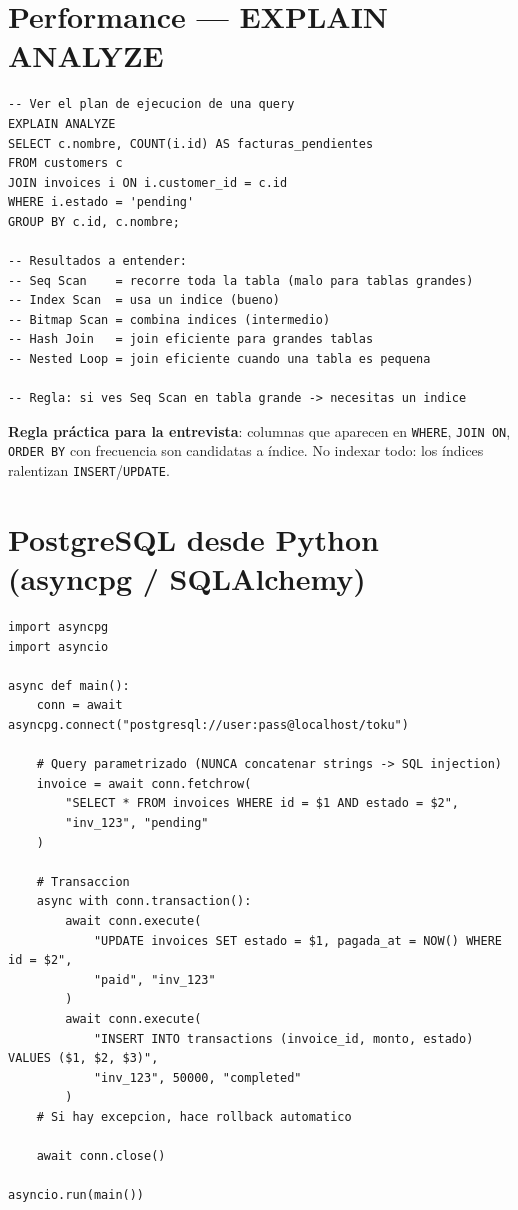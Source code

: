 \documentclass[11pt,a4paper]{article}
\begin{document}
\section{Performance — EXPLAIN ANALYZE}

\begin{lstlisting}[style=sql]
-- Ver el plan de ejecucion de una query
EXPLAIN ANALYZE
SELECT c.nombre, COUNT(i.id) AS facturas_pendientes
FROM customers c
JOIN invoices i ON i.customer_id = c.id
WHERE i.estado = 'pending'
GROUP BY c.id, c.nombre;

-- Resultados a entender:
-- Seq Scan    = recorre toda la tabla (malo para tablas grandes)
-- Index Scan  = usa un indice (bueno)
-- Bitmap Scan = combina indices (intermedio)
-- Hash Join   = join eficiente para grandes tablas
-- Nested Loop = join eficiente cuando una tabla es pequena

-- Regla: si ves Seq Scan en tabla grande -> necesitas un indice
\end{lstlisting}

\begin{tipbox}
\textbf{Regla práctica para la entrevista}: columnas que aparecen en \texttt{WHERE},
\texttt{JOIN ON}, \texttt{ORDER BY} con frecuencia son candidatas a índice.
No indexar todo: los índices ralentizan \texttt{INSERT}/\texttt{UPDATE}.
\end{tipbox}

\section{PostgreSQL desde Python (asyncpg / SQLAlchemy)}

\begin{lstlisting}[style=python]
import asyncpg
import asyncio

async def main():
    conn = await asyncpg.connect("postgresql://user:pass@localhost/toku")

    # Query parametrizado (NUNCA concatenar strings -> SQL injection)
    invoice = await conn.fetchrow(
        "SELECT * FROM invoices WHERE id = $1 AND estado = $2",
        "inv_123", "pending"
    )

    # Transaccion
    async with conn.transaction():
        await conn.execute(
            "UPDATE invoices SET estado = $1, pagada_at = NOW() WHERE id = $2",
            "paid", "inv_123"
        )
        await conn.execute(
            "INSERT INTO transactions (invoice_id, monto, estado) VALUES ($1, $2, $3)",
            "inv_123", 50000, "completed"
        )
    # Si hay excepcion, hace rollback automatico

    await conn.close()

asyncio.run(main())
\end{lstlisting}
\end{document}
